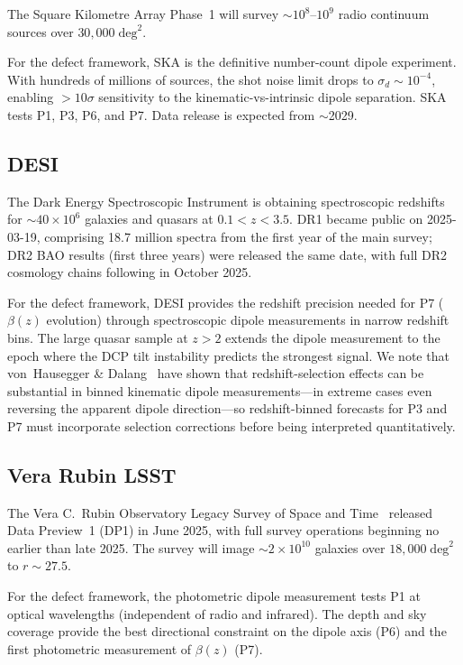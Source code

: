 The Square Kilometre Array Phase~1
\cite{SKA2020} will
survey $\sim 10^8$--$10^9$ radio continuum sources over
$30{,}000\;\mathrm{deg}^2$.

For the defect framework, SKA is the definitive number-count
dipole experiment.  With hundreds of millions of sources, the
shot noise limit drops to $\sigma_d \sim 10^{-4}$, enabling
$> 10\sigma$ sensitivity to the kinematic-vs-intrinsic dipole
separation.  SKA tests P1, P3, P6, and P7.  Data release is
expected from $\sim$2029.


\subsection{DESI}

The Dark Energy Spectroscopic Instrument
\cite{DESI2024,DESIDR1Release2025} is obtaining
spectroscopic redshifts for $\sim 40 \times 10^6$ galaxies and
quasars at $0.1 < z < 3.5$.  DR1 became public on
2025-03-19, comprising 18.7 million spectra from the first
year of the main survey; DR2 BAO results (first three years)
were released the same date, with full DR2 cosmology chains
following in October 2025.

For the defect framework, DESI provides the redshift
precision needed for P7 ($\beta(z)$ evolution) through
spectroscopic dipole measurements in narrow redshift bins.
The large quasar sample at $z > 2$ extends the dipole
measurement to the epoch where the DCP tilt instability
predicts the strongest signal.  We note that
von~Hausegger \& Dalang~\cite{vonHauseggerDalang2025}
have shown that redshift-selection effects can be substantial
in binned kinematic dipole measurements---in extreme cases
even reversing the apparent dipole direction---so
redshift-binned forecasts for P3 and P7 must incorporate
selection corrections before being interpreted
quantitatively.


\subsection{Vera Rubin LSST}

The Vera C.\ Rubin Observatory Legacy Survey of Space and
Time~\cite{Rubin2019} released Data Preview~1 (DP1) in
June 2025, with full survey operations beginning no earlier
than late 2025.  The survey will image
$\sim 2 \times 10^{10}$ galaxies over
$18{,}000\;\mathrm{deg}^2$ to $r \sim 27.5$.

For the defect framework, the photometric dipole
measurement tests P1 at optical wavelengths (independent of
radio and infrared).  The depth and sky coverage provide the
best directional constraint on the dipole axis (P6) and the
first photometric measurement of $\beta(z)$ (P7).


